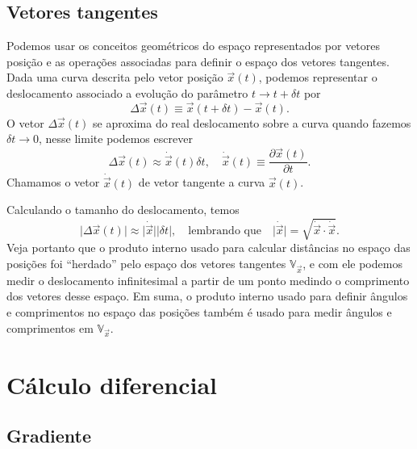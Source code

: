 \subsection{Vetores tangentes}
\label{sec:vectan}

Podemos usar os conceitos geométricos do espaço representados por vetores
posição e as operações associadas para definir o espaço dos vetores tangentes.
Dada uma curva descrita pelo vetor posição $\vec{x}(t)$, podemos representar
o deslocamento associado a evolução do parâmetro $t\to t+\delta t$ por
\begin{equation}
	\Delta \vec{x}(t) \equiv \vec{x}(t+\delta t) - \vec{x}(t).
\end{equation}
O vetor $\Delta \vec{x}(t)$ se aproxima do real deslocamento sobre a curva
quando fazemos $\delta t \to 0$, nesse limite podemos escrever
\begin{equation}
	\Delta \vec{x}(t) \approx \dot{\vec{x}}(t)\delta t,\quad \dot{\vec{x}}(t)\equiv \frac{\partial \vec{x}(t)}{\partial t}.
\end{equation}
Chamamos o vetor $\dot{\vec{x}}(t)$ de vetor tangente a curva $\vec{x}(t)$.

Calculando o tamanho do deslocamento, temos
\begin{equation}
	\vert\Delta \vec{x}(t)\vert \approx \vert\dot{\vec{x}}\vert \vert\delta t\vert,\quad\text{lembrando que}\quad \vert\dot{\vec{x}}\vert = \sqrt{\dot{\vec{x}}\cdot\dot{\vec{x}}}.
\end{equation}
Veja portanto que o produto interno usado para calcular distâncias no espaço das
posições foi ``herdado'' pelo espaço dos vetores tangentes
$\mathbb{V}_{\vec{x}}$, e com ele podemos medir o deslocamento infinitesimal a
partir de um ponto medindo o comprimento dos vetores desse espaço. Em suma, o
produto interno usado para definir ângulos e comprimentos no espaço das posições
também é usado para medir ângulos e comprimentos em $\mathbb{V}_{\vec{x}}$.

\section{Cálculo diferencial}
\label{sec:diff}
\subsection{Gradiente}

